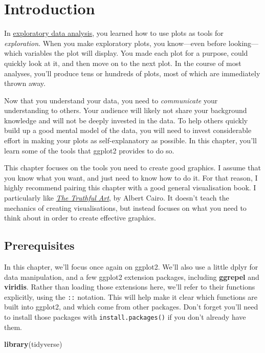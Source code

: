 \documentclass[]{book}
\newenvironment{Shaded}{\begin{snugshade}}{\end{snugshade}}
\newcommand{\KeywordTok}[1]{\textcolor[rgb]{0.13,0.29,0.53}{\textbf{{#1}}}}
\newcommand{\NormalTok}[1]{{#1}}
\begin{document}
\section{Introduction}\label{introduction-19}

In \protect\hyperlink{exploratory-data-analysis}{exploratory data
analysis}, you learned how to use plots as tools for \emph{exploration}.
When you make exploratory plots, you know---even before looking---which
variables the plot will display. You made each plot for a purpose, could
quickly look at it, and then move on to the next plot. In the course of
most analyses, you'll produce tens or hundreds of plots, most of which
are immediately thrown away.

Now that you understand your data, you need to \emph{communicate} your
understanding to others. Your audience will likely not share your
background knowledge and will not be deeply invested in the data. To
help others quickly build up a good mental model of the data, you will
need to invest considerable effort in making your plots as
self-explanatory as possible. In this chapter, you'll learn some of the
tools that ggplot2 provides to do so.

This chapter focuses on the tools you need to create good graphics. I
assume that you know what you want, and just need to know how to do it.
For that reason, I highly recommend pairing this chapter with a good
general visualisation book. I particularly like
\href{https://amzn.com/0321934075}{\emph{The Truthful Art}}, by Albert
Cairo. It doesn't teach the mechanics of creating visualisations, but
instead focuses on what you need to think about in order to create
effective graphics.

\subsection{Prerequisites}\label{prerequisites-19}

In this chapter, we'll focus once again on ggplot2. We'll also use a
little dplyr for data manipulation, and a few ggplot2 extension
packages, including \textbf{ggrepel} and \textbf{viridis}. Rather than
loading those extensions here, we'll refer to their functions
explicitly, using the \texttt{::} notation. This will help make it clear
which functions are built into ggplot2, and which come from other
packages. Don't forget you'll need to install those packages with
\texttt{install.packages()} if you don't already have them.

\begin{Shaded}
\begin{Highlighting}[]
\KeywordTok{library}\NormalTok{(tidyverse)}
\end{Highlighting}
\end{Shaded}
\end{document}
